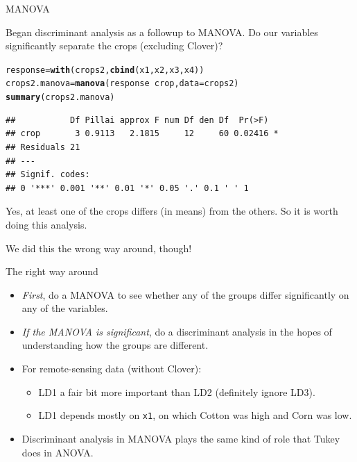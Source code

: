\documentclass[unknownkeysallowed]{beamer}\usepackage[]{graphicx}\usepackage[]{color}
\makeatletter
\newcommand{\hlopt}[1]{\textcolor[rgb]{0,0,0}{#1}}%
\newcommand{\hlstd}[1]{\textcolor[rgb]{0.345,0.345,0.345}{#1}}%
\newcommand{\hlkwb}[1]{\textcolor[rgb]{0.69,0.353,0.396}{#1}}%
\newcommand{\hlkwc}[1]{\textcolor[rgb]{0.333,0.667,0.333}{#1}}%
\newcommand{\hlkwd}[1]{\textcolor[rgb]{0.737,0.353,0.396}{\textbf{#1}}}%
\newenvironment{kframe}{%
 \def\at@end@of@kframe{}%
 \ifinner\ifhmode%
  \def\at@end@of@kframe{\end{minipage}}%
  \begin{minipage}{\columnwidth}%
 \fi\fi%
 \def\FrameCommand##1{\hskip\@totalleftmargin \hskip-\fboxsep
 \colorbox{shadecolor}{##1}\hskip-\fboxsep
     \hskip-\linewidth \hskip-\@totalleftmargin \hskip\columnwidth}%
 \MakeFramed {\advance\hsize-\width
   \@totalleftmargin\z@ \linewidth\hsize
   \@setminipage}}%
 {\par\unskip\endMakeFramed%
 \at@end@of@kframe}
\newenvironment{knitrout}{}{} %
\makeatother
\begin{document}
\begin{frame}[fragile]{MANOVA}
  
Began discriminant analysis as a followup to MANOVA. Do our variables
significantly separate the crops (excluding Clover)?

\begin{knitrout}
\color{fgcolor}\begin{kframe}
\begin{alltt}
\hlstd{response}\hlkwb{=}\hlkwd{with}\hlstd{(crops2,}\hlkwd{cbind}\hlstd{(x1,x2,x3,x4))}
\hlstd{crops2.manova}\hlkwb{=}\hlkwd{manova}\hlstd{(response}\hlopt{~}\hlstd{crop,}\hlkwc{data}\hlstd{=crops2)}
\hlkwd{summary}\hlstd{(crops2.manova)}
\end{alltt}
\begin{verbatim}
##           Df Pillai approx F num Df den Df  Pr(>F)  
## crop       3 0.9113   2.1815     12     60 0.02416 *
## Residuals 21                                        
## ---
## Signif. codes:  
## 0 '***' 0.001 '**' 0.01 '*' 0.05 '.' 0.1 ' ' 1
\end{verbatim}
\end{kframe}
\end{knitrout}

Yes, at least one of the crops differs (in means) from the others. So
it is worth doing this analysis.

We did this the wrong way around, though!
  
\end{frame}

\begin{frame}[fragile]{The right way around}
  
  \begin{itemize}
  \item \emph{First}, do a MANOVA to see whether any of the groups
    differ significantly on any of the variables.
  \item \emph{If the MANOVA is significant}, do a discriminant
    analysis in the hopes of understanding how the groups are different.
  \item For remote-sensing data (without Clover):
    \begin{itemize}
    \item LD1 a fair bit more important than LD2 (definitely ignore LD3).
    \item LD1 depends mostly on \texttt{x1}, on which Cotton was high
      and Corn was low. 
    \end{itemize}

  \item Discriminant analysis in MANOVA plays the same kind of role
    that Tukey does in ANOVA.
  \end{itemize}
  



\end{frame}
\end{document}
